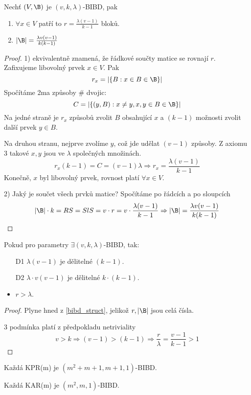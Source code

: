 \begin{theorem}\label{bibd_struct}
	Nechť $(V, \B)$ je $(v, k, \lambda)$-BIBD, pak
	\begin{enumerate}
		\item $\forall x \in V$ patří to $r = \frac{\lambda (v - 1)}{k - 1}$ bloků.
		\item $|\B| = \frac{\lambda v (v - 1)}{k(k - 1)}$
	\end{enumerate}
\end{theorem}
\begin{proof}
	1) ekvivalentně znamená, že řádkové součty matice se rovnají $r$.
	Zafixujeme libovolný prvek $x \in V$.
	Pak
	\[ r_x = |\{ B: x \in B \in \B \}| \]
	Spočítáme 2ma způsoby \# dvojic:
	\[ C = |\{ (y, B): x \ne y, x,y \in B \in \B \}| \]
	Na jedné straně je $r_x$ způsobů zvolit $B$ obsahující $x$ a $(k - 1)$ možnosti zvolit další prvek $y \in B$.

	Na druhou stranu, nejprve zvolíme $y$, což jde udělat $(v - 1)$ způsoby.
	Z axiomu 3 takové $x, y$ jsou ve $\lambda$ společných množinách.
	\[ r_x (k - 1) = C = (v - 1) \lambda \Rightarrow r_x = \frac{\lambda (v - 1)}{k - 1} \]
	Konečně, $x$ byl libovolný prvek, rovnost platí $\forall x \in V$.

	2) Jaký je součet všech prvků matice? Spočítáme po řádcích a po sloupcích
	\[ |\B| \cdot k = RS = SlS = v \cdot r = v \cdot \frac{\lambda (v - 1)}{k - 1} \Rightarrow |\B| = \frac{\lambda v (v - 1)}{k(k - 1)} \]
\end{proof}

\begin{properties}\label{bibd_struct_c}
	Pokud pro parametry $\exists (v, k, \lambda)$-BIBD, tak:
	\begin{itemize}
		\item[D1] $\lambda(v - 1)$ je dělitelné $(k - 1)$.
		\item[D2] $\lambda \cdot v(v - 1)$ je dělitelné $k \cdot (k - 1)$.
		\item $r > \lambda$.
	\end{itemize}
\end{properties}
\begin{proof}
	Plyne hned z \cref{bibd_struct}, jelikož $r, |\B|$ jsou celá čísla.

	3 podmínka platí z předpokladu netriviality
	\[ v > k \Rightarrow (v - 1) > (k - 1) \Rightarrow \frac{r}{\lambda} = \frac{v - 1}{k - 1} > 1 \]
\end{proof}

\begin{example}
	Každá KPR(m) je $(m^2 + m + 1, m + 1, 1)$-BIBD.

	Každá KAR(m) je $(m^2, m, 1)$-BIBD.
\end{example}

